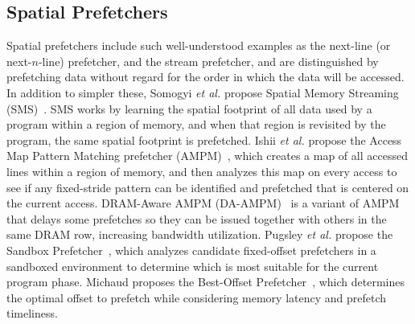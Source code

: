
\subsection{Spatial Prefetchers}


Spatial prefetchers include such well-understood examples as the next-line (or
next-$n$-line) prefetcher, and the stream prefetcher, and are distinguished by prefetching
data without regard for the order in which the data will be accessed.
In addition to simpler these, Somogyi \textit{et al.} 
propose Spatial Memory Streaming (SMS)~\cite{SMS}. SMS works by learning
the spatial footprint of all data used by a program within a region of memory,
and when that region is revisited by the program, the same spatial footprint
is prefetched. Ishii \textit{et al.} propose the Access Map Pattern Matching 
prefetcher (AMPM)~\cite{AMPM}, which creates a map of all accessed lines within a region
of memory, and then analyzes this map on every access to see if any 
fixed-stride pattern can be identified and prefetched that is centered on 
the current access. DRAM-Aware AMPM (DA-AMPM)~\cite{DA_AMPM}
is a variant of AMPM that delays some prefetches so they can be issued 
together with others in the same DRAM row, increasing bandwidth utilization.
Pugsley \textit{et al.} propose the Sandbox Prefetcher~\cite{Sandbox},
which analyzes candidate fixed-offset prefetchers in a sandboxed environment
to determine which is most suitable for the current program phase. Michaud
proposes the Best-Offset Prefetcher~\cite{BOP}, which determines the optimal
offset to prefetch while considering memory latency and prefetch timeliness.

